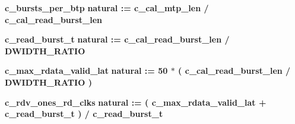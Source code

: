 \begin{DoxyCompactItemize}
\item 
{\bf c\+\_\+bursts\+\_\+per\+\_\+btp} {\bfseries \textcolor{comment}{natural}\textcolor{vhdlchar}{ }\textcolor{vhdlchar}{ }\textcolor{vhdlchar}{\+:}\textcolor{vhdlchar}{=}\textcolor{vhdlchar}{ }\textcolor{vhdlchar}{ }\textcolor{vhdlchar}{ }\textcolor{vhdlchar}{ }{\bfseries {\bf c\+\_\+cal\+\_\+mtp\+\_\+len}} \textcolor{vhdlchar}{/}\textcolor{vhdlchar}{ }\textcolor{vhdlchar}{ }\textcolor{vhdlchar}{ }{\bfseries {\bf c\+\_\+cal\+\_\+read\+\_\+burst\+\_\+len}} \textcolor{vhdlchar}{ }} 
\item 
{\bf c\+\_\+read\+\_\+burst\+\_\+t} {\bfseries \textcolor{comment}{natural}\textcolor{vhdlchar}{ }\textcolor{vhdlchar}{ }\textcolor{vhdlchar}{\+:}\textcolor{vhdlchar}{=}\textcolor{vhdlchar}{ }\textcolor{vhdlchar}{ }\textcolor{vhdlchar}{ }\textcolor{vhdlchar}{ }{\bfseries {\bf c\+\_\+cal\+\_\+read\+\_\+burst\+\_\+len}} \textcolor{vhdlchar}{/}\textcolor{vhdlchar}{ }\textcolor{vhdlchar}{ }\textcolor{vhdlchar}{ }{\bfseries {\bf D\+W\+I\+D\+T\+H\+\_\+\+R\+A\+T\+IO}} \textcolor{vhdlchar}{ }} 
\item 
{\bf c\+\_\+max\+\_\+rdata\+\_\+valid\+\_\+lat} {\bfseries \textcolor{comment}{natural}\textcolor{vhdlchar}{ }\textcolor{vhdlchar}{ }\textcolor{vhdlchar}{\+:}\textcolor{vhdlchar}{=}\textcolor{vhdlchar}{ }\textcolor{vhdlchar}{ } \textcolor{vhdldigit}{50} \textcolor{vhdlchar}{$\ast$}\textcolor{vhdlchar}{ }\textcolor{vhdlchar}{(}\textcolor{vhdlchar}{ }\textcolor{vhdlchar}{ }\textcolor{vhdlchar}{ }\textcolor{vhdlchar}{ }{\bfseries {\bf c\+\_\+cal\+\_\+read\+\_\+burst\+\_\+len}} \textcolor{vhdlchar}{/}\textcolor{vhdlchar}{ }\textcolor{vhdlchar}{ }\textcolor{vhdlchar}{ }{\bfseries {\bf D\+W\+I\+D\+T\+H\+\_\+\+R\+A\+T\+IO}} \textcolor{vhdlchar}{ }\textcolor{vhdlchar}{)}\textcolor{vhdlchar}{ }} 
\item 
{\bf c\+\_\+rdv\+\_\+ones\+\_\+rd\+\_\+clks} {\bfseries \textcolor{comment}{natural}\textcolor{vhdlchar}{ }\textcolor{vhdlchar}{ }\textcolor{vhdlchar}{\+:}\textcolor{vhdlchar}{=}\textcolor{vhdlchar}{ }\textcolor{vhdlchar}{(}\textcolor{vhdlchar}{ }\textcolor{vhdlchar}{ }\textcolor{vhdlchar}{ }\textcolor{vhdlchar}{ }{\bfseries {\bf c\+\_\+max\+\_\+rdata\+\_\+valid\+\_\+lat}} \textcolor{vhdlchar}{+}\textcolor{vhdlchar}{ }\textcolor{vhdlchar}{ }\textcolor{vhdlchar}{ }{\bfseries {\bf c\+\_\+read\+\_\+burst\+\_\+t}} \textcolor{vhdlchar}{ }\textcolor{vhdlchar}{)}\textcolor{vhdlchar}{ }\textcolor{vhdlchar}{/}\textcolor{vhdlchar}{ }\textcolor{vhdlchar}{ }\textcolor{vhdlchar}{ }{\bfseries {\bf c\+\_\+read\+\_\+burst\+\_\+t}} \textcolor{vhdlchar}{ }} 
\end{DoxyCompactItemize}
